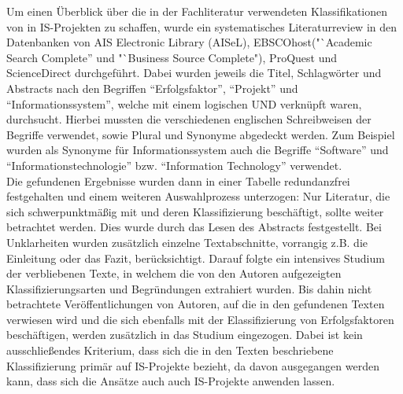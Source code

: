 Um einen Überblick über die in der Fachliteratur verwendeten Klassifikationen von \EF in IS-Projekten zu schaffen, wurde ein 
systematisches Literaturreview in den Datenbanken von AIS Electronic Library (AISeL), 
EBSCOhost("`Academic Search Complete” und "`Business Source Complete"), ProQuest und ScienceDirect durchgeführt.
Dabei wurden jeweils die Titel, Schlagwörter und Abstracts nach den Begriffen 
"`Erfolgsfaktor"', "`Projekt"' und "`Informationssystem"', welche mit einem logischen UND verknüpft waren, durchsucht. 
Hierbei mussten die verschiedenen englischen Schreibweisen der Begriffe verwendet, sowie Plural und Synonyme abgedeckt werden.
Zum Beispiel wurden als Synonyme für Informationssystem auch die Begriffe "`Software"' und "`Informationstechnologie"' bzw. "`Information Technology"' verwendet.\\
Die gefundenen Ergebnisse wurden dann in einer Tabelle redundanzfrei festgehalten und einem weiteren Auswahlprozess unterzogen:
Nur Literatur, die sich schwerpunktmäßig mit \EF und deren Klassifizierung beschäftigt, sollte weiter betrachtet werden.
Dies wurde durch das Lesen des Abstracts festgestellt. Bei Unklarheiten wurden zusätzlich einzelne Textabschnitte,
vorrangig z.B. die Einleitung oder das Fazit, berücksichtigt.
Darauf folgte ein intensives Studium der verbliebenen Texte, in welchem die von den Autoren aufgezeigten Klassifizierungsarten und Begründungen extrahiert wurden.
Bis dahin nicht betrachtete Veröffentlichungen von Autoren, auf die in den gefundenen Texten verwiesen wird und die sich ebenfalls mit der Elassifizierung von Erfolgsfaktoren
beschäftigen, werden zusätzlich in das Studium eingezogen. Dabei ist kein ausschließendes Kriterium, dass sich die in den Texten beschriebene Klassifizierung
primär auf IS-Projekte bezieht, da davon ausgegangen werden kann, dass sich die Ansätze auch auch IS-Projekte anwenden lassen.
